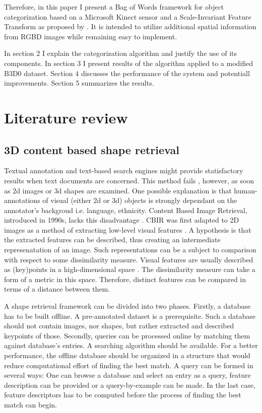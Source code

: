 \documentclass[a4paper,10pt]{article}
\begin{document}
  Therefore, in this paper I present a Bag of Words framework for object categorization based on a Microsoft Kinect sensor and a Scale-Invariant 
  Feature Transform as proposed by \cite{lowe1999object}. It is intended to utilize additional spatial information from RGBD images while
  remaining easy to implement.
  
  In section 2 I explain the categorization algorithm and justify the use of its components. In section 3 I present results
  of the algorithm applied to a modified B3D0 dataset. Section 4 discusses the performance of the system and potentiall improvements.
  Section 5 summarizes the results. 
  
\section{Literature review} 

\subsection{3D content based shape retrieval}

  Textual annotation and text-based search engines might provide statisfactory results when text documents are concerned. This method fails
  \cite{tangelder2008survey}, however, as soon as 2d images or 3d shapes are examined. One possible explanation is that human-annotations
  of visual (either 2d or 3d) objects is strongly dependant on the annotator's backgroud i.e. language, ethnicity. Content Based Image
  Retrieval, introduced in 1990s, lacks this disadvantage \cite{tangelder2008survey}. CBIR was first adapted to 2D images as a method of 
  extracting low-level visual features \cite{tsai2012bag}. A hypothesis is that the extracted features can be described, thus creating an 
  intermediate represenatation of an image. Such representations can be a subject to comparison with respect to some dissimilarity measure.
  Visual features are usually described as (key)points in a high-dimensional space \cite{tsai2012bag}. The dissimilarity measure can take a 
  form of a metric in this space. Therefore, distinct features can be compared in terms of a distance between them.

  A shape retrieval framework can be divided into two phases. Firstly, a database has to be built offline. A pre-annotated dataset is a
  prerequisite. Such a database should not contain images, nor shapes, but rather extracted and described keypoints of those. Secondly, 
  queries can be processed online by matching them against database's entries. A searching algorithm should be available. For a better 
  performance, the offline database should be organized in a structure that would reduce computational effort of finding the best match.
  A query can be formed in several ways: One can browse a database and select an entry as a query, feature description can be provided 
  or a query-by-example can be made. In the last case, feature descriptors has to be computed before the process of finding the best 
  match can begin.
\end{document}
